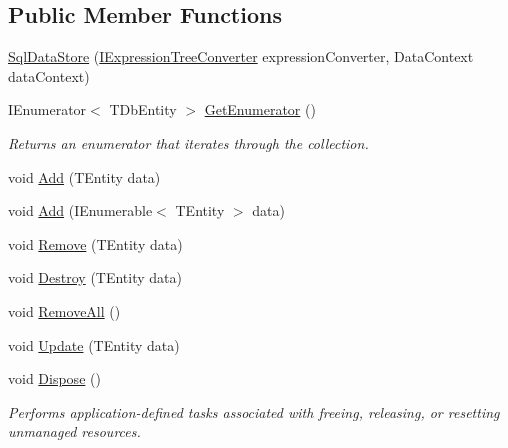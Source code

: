 \subsection*{Public Member Functions}
\begin{DoxyCompactItemize}
\item 
\hyperlink{classCqrs_1_1Sql_1_1DataStores_1_1SqlDataStore_a3ddc911126acbde0353e7773ddfa8acc_a3ddc911126acbde0353e7773ddfa8acc}{Sql\+Data\+Store} (\hyperlink{interfaceCqrs_1_1Sql_1_1DataStores_1_1IExpressionTreeConverter}{I\+Expression\+Tree\+Converter} expression\+Converter, Data\+Context data\+Context)
\item 
I\+Enumerator$<$ T\+Db\+Entity $>$ \hyperlink{classCqrs_1_1Sql_1_1DataStores_1_1SqlDataStore_a2114238ed13dfe1beaf1b096d3e36c6a_a2114238ed13dfe1beaf1b096d3e36c6a}{Get\+Enumerator} ()
\begin{DoxyCompactList}\small\item\em Returns an enumerator that iterates through the collection. \end{DoxyCompactList}\item 
void \hyperlink{classCqrs_1_1Sql_1_1DataStores_1_1SqlDataStore_a715ab041546e864cb9551d165c240f33_a715ab041546e864cb9551d165c240f33}{Add} (T\+Entity data)
\item 
void \hyperlink{classCqrs_1_1Sql_1_1DataStores_1_1SqlDataStore_a510fc3eafe64f999b99290cd8924a00e_a510fc3eafe64f999b99290cd8924a00e}{Add} (I\+Enumerable$<$ T\+Entity $>$ data)
\item 
void \hyperlink{classCqrs_1_1Sql_1_1DataStores_1_1SqlDataStore_ada15bdc873b3e4be8ff9a734d84562fb_ada15bdc873b3e4be8ff9a734d84562fb}{Remove} (T\+Entity data)
\item 
void \hyperlink{classCqrs_1_1Sql_1_1DataStores_1_1SqlDataStore_a5065ed1d4b5c66324afcde4acc68ad6b_a5065ed1d4b5c66324afcde4acc68ad6b}{Destroy} (T\+Entity data)
\item 
void \hyperlink{classCqrs_1_1Sql_1_1DataStores_1_1SqlDataStore_a5d85a9e627c74a25ef536364a6d60602_a5d85a9e627c74a25ef536364a6d60602}{Remove\+All} ()
\item 
void \hyperlink{classCqrs_1_1Sql_1_1DataStores_1_1SqlDataStore_a5cc26a4d03036f93b5942ff2e04afd2d_a5cc26a4d03036f93b5942ff2e04afd2d}{Update} (T\+Entity data)
\item 
void \hyperlink{classCqrs_1_1Sql_1_1DataStores_1_1SqlDataStore_ac142d009f768519891ca12185a2e6191_ac142d009f768519891ca12185a2e6191}{Dispose} ()
\begin{DoxyCompactList}\small\item\em Performs application-\/defined tasks associated with freeing, releasing, or resetting unmanaged resources. \end{DoxyCompactList}\end{DoxyCompactItemize}
